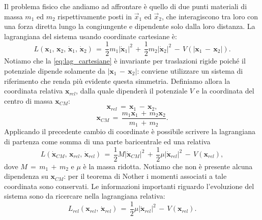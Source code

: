Il problema fisico che andiamo ad affrontare è quello di due punti materiali di massa $m_1$ ed $m_2$ rispettivamente posti in $\Vec{x}_1$ ed $\Vec{x}_2$, che interagiscono tra loro con una forza diretta lungo la congiungente e dipendente solo dalla loro distanza.
La lagrangiana del sistema usando coordinate cartesiane è:
\begin{equation}
L\left(\textbf{x}_1,\,\textbf{x}_2,\,\dot{\textbf{x}}_1,\,\dot{\textbf{x}}_2\right)\,=\,\frac{1}{2}m_1\left|\dot{\textbf{x}}_1\right|^2\,+\,\frac{1}{2}m_2\left|\dot{\textbf{x}}_2\right|^2\,-\,V\left(\left|\textbf{x}_1\,-\,\textbf{x}_2\right|\right).
\label{eq:lag_cartesiane}
\end{equation}
Notiamo che la \eqref{eq:lag_cartesiane} è invariante per traslazioni rigide poiché il potenziale dipende solamente da $\left|\textbf{x}_1\,-\,\textbf{x}_2\right|$: conviene utilizzare un sistema di riferimento che renda più evidente questa simmetria. Definiamo allora la coordinata relativa $\textbf{x}_{rel}$, dalla quale dipenderà il potenziale $V$ e la coordinata del centro di massa $\textbf{x}_{CM}$:
\begin{equation}
\textbf{x}_{rel}\,=\,\textbf{x}_1\,-\,\textbf{x}_2,
\label{eq:x_rel}
\end{equation}
\begin{equation}
\textbf{x}_{CM}\,=\,\frac{m_1\textbf{x}_1\,+\,m_2\textbf{x}_2}{m_1\,+\,m_2}.
\label{eq:x_centermass}
\end{equation}
Applicando il precedente cambio di coordinate è possibile scrivere la lagrangiana di partenza come somma di una parte baricentrale ed una relativa
\begin{equation}
L\left(\dot{\textbf{x}}_{CM},\,\textbf{x}_{rel},\,\dot{\textbf{x}}_{rel}\right)\,=\,\frac{1}{2}M\left|\dot{\textbf{x}}_{CM}\right|^2\,+\,\frac{1}{2}\mu\left|\dot{\textbf{x}}_{rel}\right|^2\,-\,V\left(\textbf{x}_{rel}\right),
\label{eq:lag_cambiocoor}
\end{equation}
dove $M\,=\,m_1\,+\,m_2$ e $\mu$ è la massa ridotta. Notiamo che non è presente alcuna dipendenza su $\textbf{x}_{CM}$: per il teorema di Nother i momenti associati a tale coordinata sono conservati. Le informazioni importanti riguardo l'evoluzione del sistema sono da ricercare nella lagrangiana relativa:
\begin{equation}
L_{rel}\left(\textbf{x}_{rel},\,\dot{\textbf{x}}_{rel}\right)\,=\,\frac{1}{2}\mu\left|\dot{\textbf{x}}_{rel}\right|^2\,-\,V\left(\textbf{x}_{rel}\right).
\label{eq:lag_rel}
\end{equation}

